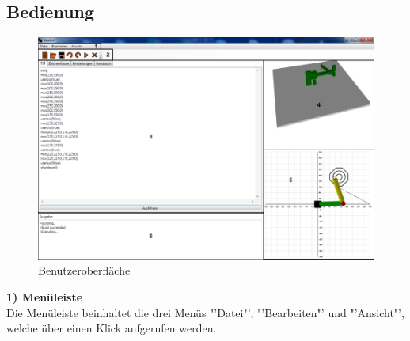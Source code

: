 \subsection{Bedienung}
\begin{figure}[H]
  \centering
  \begin{minipage}[t]{16 cm}
  	\centering
  	\includegraphics[width=16cm]{images/GUI} 
    \caption{Benutzeroberfläche}
  \end{minipage}
\end{figure}
\textbf{1) Menüleiste}\\
Die Menüleiste beinhaltet die drei Menüs "'Datei"', "'Bearbeiten"' und "'Ansicht"', welche über einen Klick aufgerufen werden.
